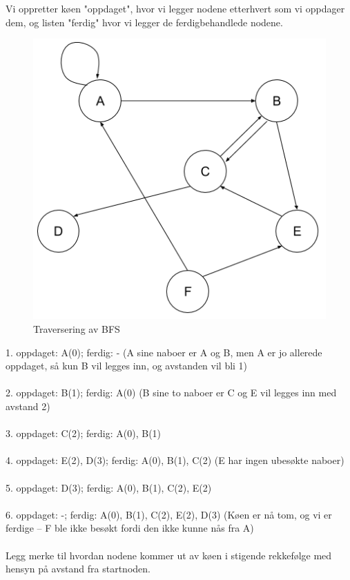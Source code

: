 \begin{boxed}
Vi oppretter køen "oppdaget", hvor vi legger nodene etterhvert som vi oppdager dem, og listen "ferdig" hvor vi legger de ferdigbehandlede nodene.

\begin{figure}[H]
\includegraphics[scale=0.5]{images/DFS}
\centering %
\caption{Traversering av BFS}
\label{fig:BFS}
\end{figure}
1. oppdaget: A(0); ferdig: - (A sine naboer er A og B, men A er jo allerede oppdaget, så kun B vil legges inn, og avstanden vil bli 1)\\\\
2. oppdaget: B(1); ferdig: A(0) (B sine to naboer er C og E vil legges inn med avstand 2)\\\\
3. oppdaget: C(2); ferdig: A(0), B(1)\\\\
4. oppdaget: E(2), D(3); ferdig: A(0), B(1), C(2) (E har ingen ubesøkte naboer)\\\\
5. oppdaget: D(3); ferdig: A(0), B(1), C(2), E(2)\\\\
6. oppdaget: -; ferdig: A(0), B(1), C(2), E(2), D(3) (Køen er nå tom, og vi er ferdige – F ble ikke besøkt fordi den ikke kunne nås fra A)\\\\
Legg merke til hvordan nodene kommer ut av køen i stigende rekkefølge med hensyn på avstand fra startnoden.
\end{boxed}


